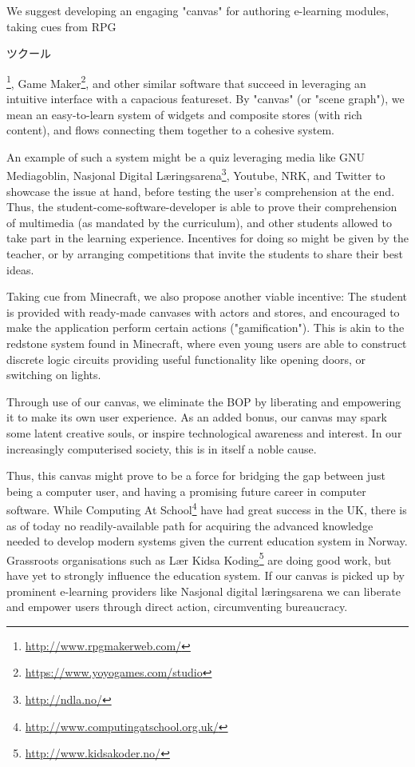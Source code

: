 We suggest developing an engaging "canvas"  for authoring e-learning modules, 
taking cues from 
RPG\begin{CJK}{UTF8}{min}ツクール\end{CJK}\footnote{\url{http://www.rpgmakerweb.com/}}, 
Game Maker\footnote{\url{https://www.yoyogames.com/studio}}, and other similar 
software that succeed in leveraging an intuitive interface with a capacious 
featureset. By "canvas" (or "scene graph"), we mean an easy-to-learn system of 
widgets and composite stores (with rich content), and flows connecting them 
together to a cohesive system. 

An example of such a system might be a quiz leveraging media like GNU 
Mediagoblin, Nasjonal Digital Læringsarena\footnote{\url{http://ndla.no/}}, 
Youtube, NRK, and Twitter to showcase the issue at hand, before testing the 
user's comprehension at the end. Thus, the student-come-software-developer is 
able to prove their comprehension of multimedia (as mandated by the 
curriculum), and other students allowed to take part in the learning 
experience. Incentives for doing so might be given by the teacher, or by 
arranging competitions that invite the students to share their best ideas.

Taking cue from Minecraft, we also propose another viable incentive: The 
student is provided with ready-made canvases with actors and stores, and 
encouraged to make the application perform certain actions ("gamification"). 
This is akin to the redstone system found in Minecraft, where even young users 
are able to construct discrete logic circuits providing useful functionality 
like opening doors, or switching on lights\cite{brand2013crafting}.

Through use of our canvas, we eliminate the BOP by liberating and empowering 
it to make its own user experience. As an added bonus, our canvas may spark 
some latent creative souls, or inspire technological awareness and interest. 
In our increasingly computerised society, this is in itself a noble cause. 

Thus, this canvas might prove to be a force for bridging the gap between just 
being a computer user, and having a promising future career in computer 
software. While Computing At 
School\footnote{\url{http://www.computingatschool.org.uk/}} have had great 
success in the UK, there is as of today no readily-available path for 
acquiring the advanced knowledge needed to develop modern systems given the 
current education system in Norway. Grassroots organisations such as Lær Kidsa 
Koding\footnote{\url{http://www.kidsakoder.no/}} are doing good work, but have 
yet to strongly influence the education system. If our canvas is picked up by 
prominent e-learning providers like Nasjonal digital læringsarena we can 
liberate and empower users through direct action, circumventing bureaucracy.

